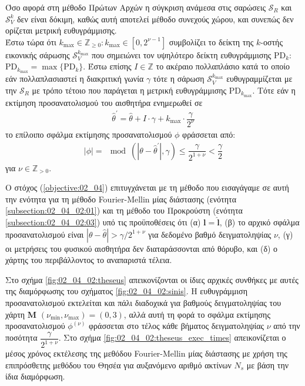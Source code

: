 Όσο αφορά στη μέθοδο Πρώτων Αρχών η σύγκριση ανάμεσα στις σαρώσεις
$\mathcal{S}_R$ και $\mathcal{S}_V^k$ δεν είναι δόκιμη, καθώς αυτή αποτελεί
μέθοδο συνεχούς χώρου, και συνεπώς δεν ορίζεται μετρική ευθυγράμμισης. \\

Έστω τώρα ότι $k_{\max} \in \mathbb{Z}_{\geq 0} : k_{\max} \in [0,2^{\nu-1}]$
συμβολίζει το δείκτη της $k$-οστής εικονικής σάρωσης $\mathcal{S}_V^{k_{\max}}$
που σημειώνει τον υψηλότερο δείκτη ευθυγράμμισης PD$_k$:
$\text{PD}_{k_{\max}} = \max \{\text{PD}_k\}$. Έστω επίσης $I \in \mathbb{Z}$
το ακέραιο πολλαπλάσιο κατά το οποίο εάν πολλαπλασιαστεί η διακριτική γωνία
$\gamma$ τότε η σάρωση $\mathcal{S}_V^{k_{\max}}$ ευθυγραμμίζεται με την
$\mathcal{S}_R$ με τρόπο τέτοιο που παράγεται η μετρική ευθυγράμμισης
PD$_{k_{\max}}$. Τότε εάν η εκτίμηση προσανατολισμού του αισθητήρα ενημερωθεί
σε
\begin{align}
  \hat{\theta}^\prime = \hat{\theta} + I \cdot \gamma + k_{\max} \cdot \dfrac{\gamma}{2^\nu}
\end{align}
το επίλοιπο σφάλμα εκτίμησης προσανατολισμού $\phi$ φράσσεται από:
\begin{align}
  |\phi| = \mod(|\theta - \hat{\theta}^\prime|, \gamma) \leq \dfrac{\gamma}{2^{1+\nu}} < \dfrac{\gamma}{2}
  \label{eq:phi_theseus}
\end{align}
για $\nu \in \mathbb{Z}_{>0}$.

Ο στόχος (\ref{objective:02_04}) επιτυγχάνεται με τη μέθοδο που εισαγάγαμε σε
αυτή την ενότητα για τη μέθοδο Fourier-Mellin μίας διάστασης (ενότητα
\ref{subsection:02_04_02:01}) και τη μέθοδο του Προκρούστη (ενότητα
\ref{subsection:02_04_02:03}) υπό τις προϋποθέσεις ότι (α)
$\bm{l} = \hat{\bm{l}}$, (β) το αρχικό σφάλμα προσανατολισμού είναι
$|\theta - \hat{\theta}| > \gamma / 2^{1+\nu}$ για δεδομένο βαθμό
δειγματοληψίας $\nu$, (γ) οι μετρήσεις του φυσικού αισθητήρα δεν διαταράσσονται
από θόρυβο, και (δ) ο χάρτης του περιβάλλοντος το αναπαριστά τέλεια.

Στο σχήμα \ref{fig:02_04_02:theseus} απεικονίζονται οι ίδιες αρχικές συνθήκες
με αυτές της διαμόρφωσης του σχήματος \ref{fig:02_04_02:sinis}. Η ευθυγράμμιση
προσανατολισμού εκτελείται και πάλι διαδοχικά για βαθμούς δειγματοληψίας του
χάρτη $\bm{M}$ $(\nu_{\min}, \nu_{\max}) = (0,3)$, αλλά αυτή τη φορά το σφάλμα
εκτίμησης προσανατολισμού $\phi^{(\nu)}$ φράσσεται στο τέλος κάθε βήματος
δειγματοληψίας $\nu$ από την ποσότητα $\dfrac{\gamma}{2^{1+\nu}}$. Στο σχήμα
\ref{fig:02_04_02:theseus_exec_times} απεικονίζεται ο μέσος χρόνος εκτέλεσης
της μεθόδου Fourier-Mellin μίας διάστασης με χρήση της επιπρόσθετης μεθόδου
του Θησέα για αυξανόμενο αριθμό ακτίνων $N_s$ με βάση την ίδια διαμόρφωση.

